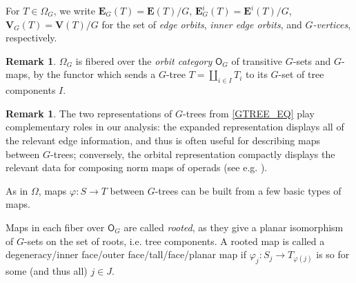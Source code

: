 \documentclass[a4paper,10pt]{article}%
\numberwithin{equation}{section}
\numberwithin{figure}{section}
\theoremstyle{definition} %
\newtheorem{remark}[equation]{Remark}%
\newcommand{\1}{\ensuremath{\mathbbm 1}}%
\begin{document}
For $T \in \Omega_G$, we write
$\boldsymbol{E}_G(T) = \boldsymbol{E}(T)/G$, $\boldsymbol{E}^i_G(T) = \boldsymbol{E}^i(T)/G$, $\boldsymbol{V}_G(T) = \boldsymbol{V}(T)/G$
for the set of \textit{edge orbits}, \textit{inner edge orbits}, and \textit{$G$-vertices}, respectively.

\begin{remark}
      $\Omega_G$ is fibered over the \textit{orbit category} $\mathsf O_G$ of transitive $G$-sets and $G$-maps,
      by the functor which sends a $G$-tree $T = \amalg_{i \in I} T_i$ to its $G$-set of tree components $I$.
\end{remark}


\begin{remark}
      The two representations of $G$-trees from \eqref{GTREE_EQ} play complementary roles in our analysis:
      the expanded representation displays all of the relevant edge information, and thus is often useful for describing maps between $G$-trees;
      conversely, the orbital representation compactly displays the relevant data for composing norm maps of operads (see e.g. \cite[Remark 3.39]{BP_edss}).
\end{remark}

As in $\Omega$,
maps $\varphi \colon S \to T$ between $G$-trees
can be built from a few basic types of maps.

Maps in each fiber over $\mathsf O_G$ are called \textit{rooted},
as they give a planar isomorphism of $G$-sets on the set of roots, i.e. tree components.
A rooted map is called a
degeneracy/inner face/outer face/tall/face/planar map
if
$\varphi_j \colon S_j \to T_{\varphi(j)}$ is so for some (and thus all) $j \in J$.
\end{document}
